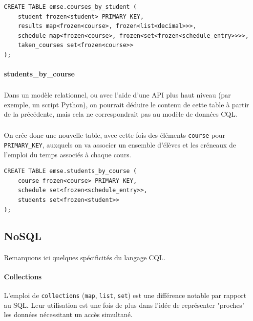 \documentclass[a4paper, 11pt]{article}
\begin{document}
\small
\begin{tcolorbox}
\begin{lstlisting}
CREATE TABLE emse.courses_by_student (
    student frozen<student> PRIMARY KEY,
    results map<frozen<course>, frozen<list<decimal>>>,
    schedule map<frozen<course>, frozen<set<frozen<schedule_entry>>>>,
    taken_courses set<frozen<course>>
);
\end{lstlisting}
\end{tcolorbox}
\normalsize


\paragraph{students\_by\_course}
\subparagraph{}
Dans un modèle relationnel, ou avec l'aide d'une API plus haut niveau (par exemple, un script Python), on pourrait déduire le contenu de cette table à partir de la précédente, mais cela ne correspondrait pas au modèle de données CQL.

\subparagraph{}
On crée donc une nouvelle table, avec cette fois des éléments \texttt{course} pour \texttt{PRIMARY\_KEY}, auxquels on va associer un ensemble d'élèves et les créneaux de l'emploi du temps associés à chaque cours.

\begin{tcolorbox}
\begin{lstlisting}
CREATE TABLE emse.students_by_course (
    course frozen<course> PRIMARY KEY,
    schedule set<frozen<schedule_entry>>,
    students set<frozen<student>>
);
\end{lstlisting}
\end{tcolorbox}

\subsection{NoSQL}
\paragraph{}
Remarquons ici quelques spécificités du langage CQL.

\paragraph{Collections\\}
L'emploi de \texttt{collections} (\texttt{map}, \texttt{list}, \texttt{set}) est une différence notable par rapport au SQL. Leur utilisation est une fois de plus dans l'idée de représenter "proches" les données nécessitant un accès simultané.
\end{document}
